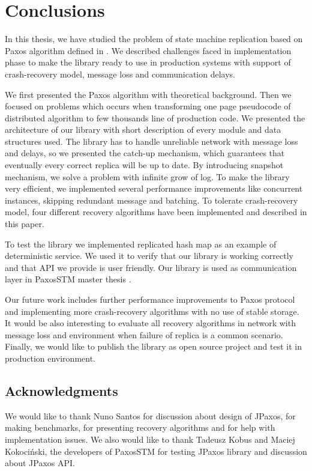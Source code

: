 \chapter{Conclusions}

In this thesis, we have studied the problem of state machine replication based
on Paxos algorithm defined in \cite{Lam98}. We described challenges faced in
implementation phase to make the library ready to use in production systems
with support of crash-recovery model, message loss and communication delays.

We first presented the Paxos algorithm with theoretical background. Then we
focused on problems which occurs when transforming one page pseudocode of
distributed algorithm to few thousands line of production code. We presented
the architecture of our library with short description of every module and data
structures used. The library has to handle unreliable network with message
loss and delays, so we presented the catch-up mechanism, which guarantees that
eventually every correct replica will be up to date. By introducing snapshot
mechanism, we solve a problem with infinite grow of log. To make the library
very efficient, we implemented several performance improvements like concurrent
instances, skipping redundant message and batching. To tolerate crash-recovery
model, four different recovery algorithms have been implemented and described in
this paper.

To test the library we implemented replicated hash map as an example of
deterministic service. We used it to verify that our library is working
correctly and that API we provide is user friendly. Our library is used as 
communication layer in PaxosSTM master thesis \cite{Tad10}.

Our future work includes further performance improvements to Paxos protocol and
implementing more crash-recovery algorithms with no use of stable storage.  It
would be also interesting to evaluate all recovery algorithms in network with
message loss and environment when failure of replica is a common scenario.
Finally, we would like to publish the library as open source project and test it
in production environment.

\section*{Acknowledgments}

\noindent We would like to thank Nuno Santos for discussion about design of JPaxos, for making benchmarks, for presenting recovery algorithms and for help with implementation issues. We also would like to thank Tadeusz Kobus and Maciej Kokociński, the developers of PaxosSTM for testing JPaxos library and discussion about JPaxos API.

\cleardoublepage
